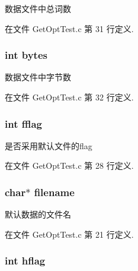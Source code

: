 数据文件中总词数 



在文件 Get\-Opt\-Test.\-c 第 31 行定义.

\hypertarget{structglobal_args__t_a3e18e5ab1201e205ce88c473a2f4bf99}{
\subsubsection[{bytes}]{\setlength{\rightskip}{0pt plus 5cm}int bytes}}\label{structglobal_args__t_a3e18e5ab1201e205ce88c473a2f4bf99}


数据文件中字节数 



在文件 Get\-Opt\-Test.\-c 第 32 行定义.

\hypertarget{structglobal_args__t_aab9e30d72b4b6af02ce19b24422ad2ce}{
\subsubsection[{fflag}]{\setlength{\rightskip}{0pt plus 5cm}int fflag}}\label{structglobal_args__t_aab9e30d72b4b6af02ce19b24422ad2ce}


是否采用默认文件的flag 



在文件 Get\-Opt\-Test.\-c 第 28 行定义.

\hypertarget{structglobal_args__t_aeac90097f29f7529968697163cea5c18}{
\subsubsection[{filename}]{\setlength{\rightskip}{0pt plus 5cm}char$\ast$ filename}}\label{structglobal_args__t_aeac90097f29f7529968697163cea5c18}


默认数据的文件名 



在文件 Get\-Opt\-Test.\-c 第 21 行定义.

\hypertarget{structglobal_args__t_a6fe8b762116512ab777118cd3e043200}{
\subsubsection[{hflag}]{\setlength{\rightskip}{0pt plus 5cm}int hflag}}\label{structglobal_args__t_a6fe8b762116512ab777118cd3e043200}


